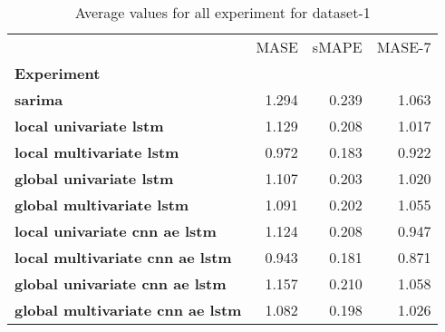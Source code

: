 \begin{table}[h]
\centering
\caption{Average values for all experiment for dataset-1}
\label{table:Average-metric-dataset-1}
\begin{tabular}{lrrr}
\toprule
{} &   MASE &  sMAPE &  MASE-7 \\
\textbf{Experiment                     } &        &        &         \\
\midrule
\textbf{sarima                         } &  1.294 &  0.239 &   1.063 \\
\textbf{local univariate lstm          } &  1.129 &  0.208 &   1.017 \\
\textbf{local multivariate lstm        } &  0.972 &  0.183 &   0.922 \\
\textbf{global univariate lstm         } &  1.107 &  0.203 &   1.020 \\
\textbf{global multivariate lstm       } &  1.091 &  0.202 &   1.055 \\
\textbf{local univariate cnn ae lstm   } &  1.124 &  0.208 &   0.947 \\
\textbf{local multivariate cnn ae lstm } &  0.943 &  0.181 &   0.871 \\
\textbf{global univariate cnn ae lstm  } &  1.157 &  0.210 &   1.058 \\
\textbf{global multivariate cnn ae lstm} &  1.082 &  0.198 &   1.026 \\
\bottomrule
\end{tabular}
\end{table}
